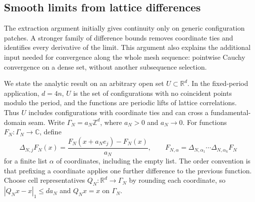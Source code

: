\subsection{Smooth limits from lattice differences}
\label{ex-smooth-limits}

The extraction argument initially gives continuity only on generic
configuration patches. A stronger family of difference bounds removes
coordinate ties and identifies every derivative of the limit. This
argument also explains the additional input needed for convergence along
the whole mesh sequence: pointwise Cauchy convergence on a dense set,
without another subsequence selection.

We state the analytic result on an arbitrary open set
\(U\subset\mathbb R^d\). In the fixed-period application,
\(d=4n\), \(U\) is the set of configurations with no coincident
points modulo the period, and the functions are periodic lifts of lattice
correlations. Thus \(U\) includes configurations with coordinate ties
and can cross a fundamental-domain seam. Write
\(\Gamma_N=a_N\mathbb Z^d\), where \(a_N>0\) and \(a_N\to0\).
For functions \(F_N:\Gamma_N\to\mathbb C\), define
\[
 \Delta_{N,j}F_N(x)=\frac{F_N(x+a_Ne_j)-F_N(x)}{a_N},
 \qquad
 F_{N,\alpha}=\Delta_{N,\alpha_1}\cdots
                    \Delta_{N,\alpha_k}F_N
\]
for a finite list \(\alpha\) of coordinates, including the empty list.
The order convention is that prefixing a coordinate applies one further
difference to the previous function. Choose cell representatives
\(Q_N:\mathbb R^d\to\Gamma_N\) by rounding each coordinate, so
\(|Q_Nx-x|_1\le da_N\) and \(Q_Nx=x\) on \(\Gamma_N\).

